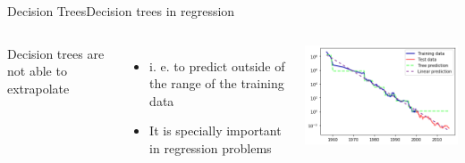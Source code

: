 \documentclass[10pt,compress]{beamer} %
\begin{document}
\begin{frame}{Decision Trees}{Decision trees in regression}
   \begin{columns}
           Decision trees are not able to extrapolate
           \begin{itemize}
                \item i. e. to predict outside of the range of the training data
                \item It is specially important in regression problems
           \end{itemize}
 
        \includegraphics[width=\linewidth]{figs/tree-regression.png}
    \end{columns}
\end{frame}
\end{document}
